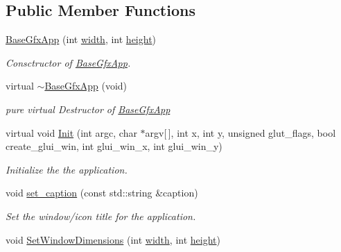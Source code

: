 \subsection*{Public Member Functions}
\begin{DoxyCompactItemize}
\item 
\hyperlink{classimage__tools_1_1BaseGfxApp_abdf78453f987997db4f4970b3b873d19}{Base\+Gfx\+App} (int \hyperlink{classimage__tools_1_1BaseGfxApp_a2fe403c5392f624477c2ce4429f1a7b5}{width}, int \hyperlink{classimage__tools_1_1BaseGfxApp_aa961e13a7a8e6062204223cc33ac7503}{height})\hypertarget{classimage__tools_1_1BaseGfxApp_abdf78453f987997db4f4970b3b873d19}{}\label{classimage__tools_1_1BaseGfxApp_abdf78453f987997db4f4970b3b873d19}

\begin{DoxyCompactList}\small\item\em Consctructor of \hyperlink{classimage__tools_1_1BaseGfxApp}{Base\+Gfx\+App}. \end{DoxyCompactList}\item 
virtual \hyperlink{classimage__tools_1_1BaseGfxApp_a1305cf094cb0c493b10cb1ba4275e92e}{$\sim$\+Base\+Gfx\+App} (void)\hypertarget{classimage__tools_1_1BaseGfxApp_a1305cf094cb0c493b10cb1ba4275e92e}{}\label{classimage__tools_1_1BaseGfxApp_a1305cf094cb0c493b10cb1ba4275e92e}

\begin{DoxyCompactList}\small\item\em pure virtual Destructor of \hyperlink{classimage__tools_1_1BaseGfxApp}{Base\+Gfx\+App} \end{DoxyCompactList}\item 
virtual void \hyperlink{classimage__tools_1_1BaseGfxApp_a7e7e8df01cdbb96d13b7779a1f17622d}{Init} (int argc, char $\ast$argv\mbox{[}$\,$\mbox{]}, int x, int y, unsigned glut\+\_\+flags, bool create\+\_\+glui\+\_\+win, int glui\+\_\+win\+\_\+x, int glui\+\_\+win\+\_\+y)
\begin{DoxyCompactList}\small\item\em Initialize the the application. \end{DoxyCompactList}\item 
void \hyperlink{classimage__tools_1_1BaseGfxApp_a82465649f9a908d341e1db1a2e39bdc8}{set\+\_\+caption} (const std\+::string \&caption)\hypertarget{classimage__tools_1_1BaseGfxApp_a82465649f9a908d341e1db1a2e39bdc8}{}\label{classimage__tools_1_1BaseGfxApp_a82465649f9a908d341e1db1a2e39bdc8}

\begin{DoxyCompactList}\small\item\em Set the window/icon title for the application. \end{DoxyCompactList}\item 
void \hyperlink{classimage__tools_1_1BaseGfxApp_aeaa3a1aef12d88e4ab0665ff841e8d8d}{Set\+Window\+Dimensions} (int \hyperlink{classimage__tools_1_1BaseGfxApp_a2fe403c5392f624477c2ce4429f1a7b5}{width}, int \hyperlink{classimage__tools_1_1BaseGfxApp_aa961e13a7a8e6062204223cc33ac7503}{height})\hypertarget{classimage__tools_1_1BaseGfxApp_aeaa3a1aef12d88e4ab0665ff841e8d8d}{}\label{classimage__tools_1_1BaseGfxApp_aeaa3a1aef12d88e4ab0665ff841e8d8d}


\end{DoxyCompactItemize}
